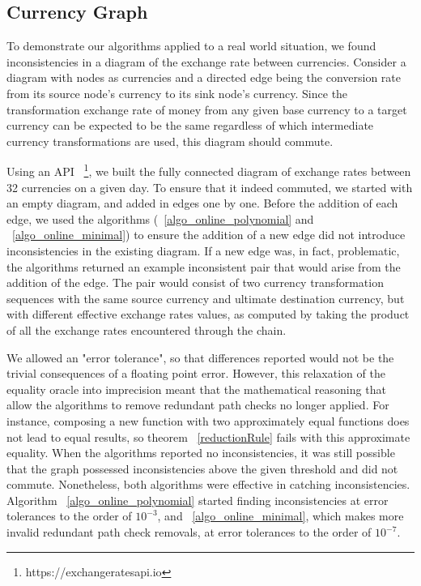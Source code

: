 \documentclass[sigplan,review,anonymous]{acmart}
\begin{document}
{\subsection{Currency Graph}
\label{sec:currency}

To demonstrate our algorithms applied to a real world situation, 
we found inconsistencies in a diagram of the exchange rate between currencies.
Consider a diagram with nodes as currencies and a directed edge being the
conversion rate from its source node's currency to its sink node's currency.
Since the transformation exchange rate of money from any given base currency to a target currency
can be expected to be the same regardless of which intermediate currency transformations
are used, this diagram should commute.

Using an API ~\footnote{https://exchangeratesapi.io}, we built the fully connected diagram of exchange rates between 32 currencies on a given day.
To ensure that it indeed commuted, we started with an empty diagram, and added in edges one by one.
Before the addition of each edge, we used the algorithms (~\ref{algo_online_polynomial} and ~\ref{algo_online_minimal}) to ensure the addition of a new edge did not introduce inconsistencies in the existing diagram.
If a new edge was, in fact, problematic, the algorithms returned an example inconsistent
pair that would arise from the addition of the edge.
The pair would consist of two currency transformation sequences with the 
same source currency and ultimate destination currency, but with different effective 
exchange rates values, as computed by taking the product of all the exchange rates
encountered through the chain.

We allowed an "error tolerance", so that differences reported would not be the trivial consequences of a floating point error.
However, this relaxation of the equality oracle into imprecision meant that the mathematical reasoning that allow the algorithms to remove redundant path checks no longer applied.
For instance, composing a new function with two approximately equal functions does not lead to equal results, so theorem ~\ref{reductionRule} fails with this approximate equality.
When the algorithms reported no inconsistencies, it was still possible that the graph possessed inconsistencies above the given threshold and did not commute.
Nonetheless, both algorithms were effective in catching inconsistencies. Algorithm ~\ref{algo_online_polynomial} started finding inconsistencies at error tolerances to the order of $10^{-3}$, and ~\ref{algo_online_minimal}, which makes more invalid redundant path check removals, at error tolerances to the order of $10^{-7}$.

}
\end{document}
